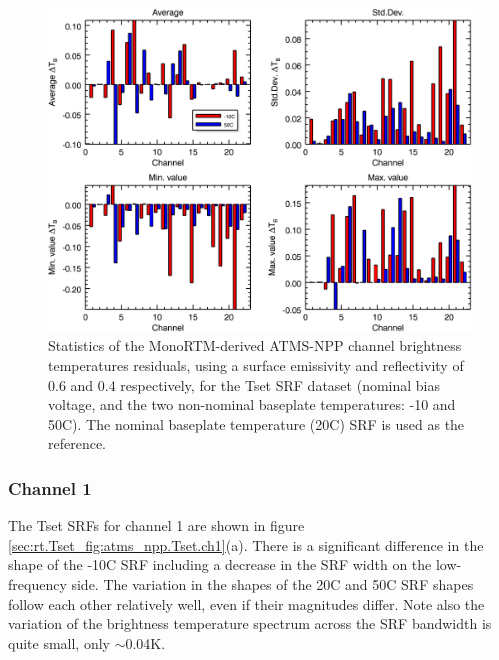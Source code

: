 \begin{figure}[H]
  \centering
    \includegraphics[bb=0 0 416 333,clip,scale=0.9]{graphics/dtb/Tset/e0.6_r0.4/stats_ref-nominal.png} 
  \caption{Statistics of the MonoRTM-derived ATMS-NPP channel brightness temperatures residuals, using a surface emissivity and reflectivity of 0.6 and 0.4 respectively, for the Tset SRF dataset (nominal bias voltage, and the two non-nominal baseplate temperatures: -10 and 50\textdegree{}C). The nominal baseplate temperature (20\textdegree{}C) SRF is used as the reference.}
  \label{fig:Tset_e0.6_r0.4_stats_ref-nominal}
\end{figure}



\subsubsection{Channel 1}
The Tset SRFs for channel 1 are shown in figure \ref{sec:rt.Tset_fig:atms_npp.Tset.ch1}(a). There is a significant difference in the shape of the -10\textdegree{}C SRF including a decrease in the SRF width on the low-frequency side. The variation in the shapes of the 20\textdegree{}C and 50\textdegree{}C SRF shapes follow each other relatively well, even if their magnitudes differ. Note also the variation of the brightness temperature spectrum across the SRF bandwidth is quite small, only $\sim$0.04K.

